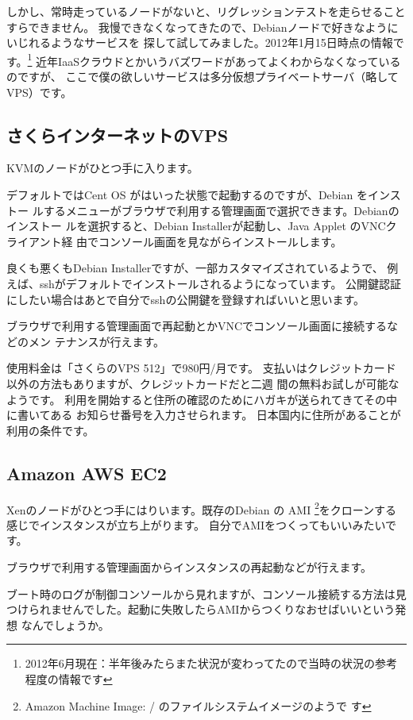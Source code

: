 \documentclass[mingoth,a4paper]{jsarticle}
\begin{document}
しかし、常時走っているノードがないと、リグレッションテストを走らせること
すらできません。
我慢できなくなってきたので、Debianノードで好きなようにいじれるようなサービスを
探して試してみました。2012年1月15日時点の情報です。\footnote{2012年6月現在：半年後みたらまた状況が変わってたので当時の状況の参考程度の情報です}
近年IaaSクラウドとかいうバズワードがあってよくわからなくなっているのですが、
ここで僕の欲しいサービスは多分仮想プライベートサーバ（略してVPS）です。

\subsection{さくらインターネットのVPS}

KVMのノードがひとつ手に入ります。

デフォルトではCent OS がはいった状態で起動するのですが、Debian をインストー
ルするメニューがブラウザで利用する管理画面で選択できます。Debianのインストー
ルを選択すると、Debian Installerが起動し、Java Applet のVNCクライアント経
由でコンソール画面を見ながらインストールします。

良くも悪くもDebian Installerですが、一部カスタマイズされているようで、
例えば、sshがデフォルトでインストールされるようになっています。
公開鍵認証にしたい場合はあとで自分でsshの公開鍵を登録すればいいと思います。

ブラウザで利用する管理画面で再起動とかVNCでコンソール画面に接続するなどのメン
テナンスが行えます。

使用料金は「さくらのVPS 512」で980円/月です。
支払いはクレジットカード以外の方法もありますが、クレジットカードだと二週
間の無料お試しが可能なようです。
利用を開始すると住所の確認のためにハガキが送られてきてその中に書いてある
お知らせ番号を入力させられます。
日本国内に住所があることが利用の条件です。

\subsection{Amazon AWS EC2}
Xenのノードがひとつ手にはりいます。既存のDebian の AMI \footnote{Amazon
Machine Image: / のファイルシステムイメージのようで
す}\cite{debianec2image}をクローンする感じでインスタンスが立ち上がります。
自分でAMIをつくってもいいみたいです。

ブラウザで利用する管理画面からインスタンスの再起動などが行えます。

ブート時のログが制御コンソールから見れますが、コンソール接続する方法は見
つけられませんでした。起動に失敗したらAMIからつくりなおせばいいという発想
なんでしょうか。
\end{document}
